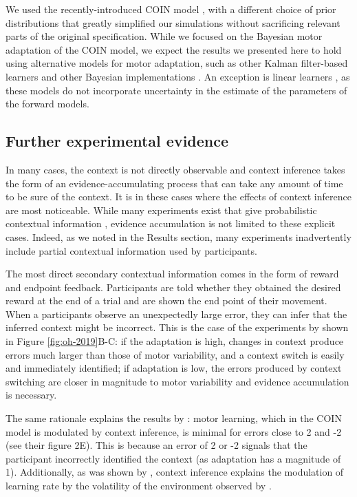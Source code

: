 \documentclass[a4paper,doc,floatsintext,natbib]{apa6}
\def \fref #1{Figure \ref{#1}}     %
\begin{document}
We used the recently-introduced COIN model \cite{Heald_Contextual_2021}, with a different choice of prior distributions that greatly simplified our simulations without sacrificing relevant parts of the original specification. While we focused on the Bayesian motor adaptation of the COIN model, we expect the results we presented here to hold using alternative models for motor adaptation, such as other Kalman filter-based learners \cite[e.g.][]{Oh_Minimizing_2019,Baddeley_System_2003} and other Bayesian implementations \cite[e.g.][]{Wolpert_Multiple_1998,Kording_Bayesian_2004}. An exception is linear learners \cite[e.g.][]{Smith_Interacting_2006,Forano_Timescales_2020,Lee_Dual_2009}, as these models do not incorporate uncertainty in the estimate of the parameters of the forward models.

\subsection{Further experimental evidence}
In many cases, the context is not directly observable and context inference takes the form of an evidence-accumulating process that can take any amount of time to be sure of the context. It is in these cases where the effects of context inference are most noticeable. While many experiments exist that give probabilistic contextual information \cite[e.g.][]{Scholz_uncontrolled_1999,Behrens_Learning_2007,Nassar_Dissociable_2019}, evidence accumulation is not limited to these explicit cases. Indeed, as we noted in the Results section, many experiments inadvertently include partial contextual information used by participants.

The most direct secondary contextual information comes in the form of reward and endpoint feedback. Participants are told whether they obtained the desired reward at the end of a trial and are shown the end point of their movement. When a participants observe an unexpectedly large error, they can infer that the inferred context might be incorrect. This is the case of the experiments by \cite{Oh_Minimizing_2019} shown in \fref{fig:oh-2019}B-C: if the adaptation is high, changes in context produce errors much larger than those of motor variability, and a context switch is easily and immediately identified; if adaptation is low, the errors produced by context switching are closer in magnitude to motor variability and evidence accumulation is necessary.

The same rationale explains the results by \cite{Herzfeld_memory_2014}: motor learning, which in the COIN model is modulated by context inference, is minimal for errors close to 2 and -2 (see their figure 2E). This is because an error of 2 or -2 signals that the participant incorrectly identified the context (as adaptation has a magnitude of 1). Additionally, as was shown by \cite{Heald_Contextual_2021}, context inference explains the modulation of learning rate by the volatility of the environment observed by \cite{Herzfeld_memory_2014}.
\end{document}
